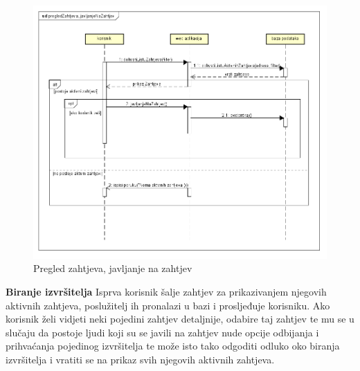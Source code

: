 				\newpage
				\begin{figure}[H]
					\includegraphics[scale=0.7]{slike/pregled-zahtjeva.png} %
					\centering
					\caption{Pregled zahtjeva, javljanje na zahtjev}
				\end{figure}
				\newpage
								
				\noindent \large {\textbf{Biranje izvršitelja}}
				\newline
				\noindent \normalsize Isprva korisnik šalje zahtjev za prikazivanjem njegovih aktivnih zahtjeva, poslužitelj ih pronalazi u bazi i prosljeđuje korisniku. Ako korisnik želi vidjeti neki pojedini zahtjev detaljnije, odabire taj zahtjev te mu se u slučaju da postoje ljudi koji su se javili na zahtjev nude opcije odbijanja i prihvaćanja pojedinog izvršitelja te može isto tako odgoditi odluko oko biranja izvršitelja i vratiti se na prikaz svih njegovih aktivnih zahtjeva. 
				   
